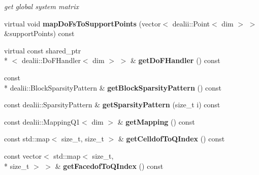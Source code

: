 \begin{DoxyCompactItemize}
\begin{DoxyCompactList}\small\item\em get global system matrix \end{DoxyCompactList}\item 
\hypertarget{classnatrium_1_1SEDGMinLee_ab01fe7f989aed26cb5547eaba8ddb4ee}{virtual void {\bfseries map\-Do\-Fs\-To\-Support\-Points} (vector$<$ dealii\-::\-Point$<$ dim $>$ $>$ \&support\-Points) const }\label{classnatrium_1_1SEDGMinLee_ab01fe7f989aed26cb5547eaba8ddb4ee}

\item 
\hypertarget{classnatrium_1_1SEDGMinLee_a3ffd3d7bc5aae9dbb5a021d7e4913f65}{virtual const shared\-\_\-ptr\\*
$<$ dealii\-::\-Do\-F\-Handler$<$ dim $>$ $>$ \& {\bfseries get\-Do\-F\-Handler} () const }\label{classnatrium_1_1SEDGMinLee_a3ffd3d7bc5aae9dbb5a021d7e4913f65}

\item 
\hypertarget{classnatrium_1_1SEDGMinLee_a10acabaac20a992130e88fb9bd395d31}{const \\*
dealii\-::\-Block\-Sparsity\-Pattern \& {\bfseries get\-Block\-Sparsity\-Pattern} () const }\label{classnatrium_1_1SEDGMinLee_a10acabaac20a992130e88fb9bd395d31}

\item 
\hypertarget{classnatrium_1_1SEDGMinLee_ac9392932aaab8186b427b9d12bc64771}{const dealii\-::\-Sparsity\-Pattern \& {\bfseries get\-Sparsity\-Pattern} (size\-\_\-t i) const }\label{classnatrium_1_1SEDGMinLee_ac9392932aaab8186b427b9d12bc64771}

\item 
\hypertarget{classnatrium_1_1SEDGMinLee_a7d093da19c6796a3021f5d3f4beab542}{const dealii\-::\-Mapping\-Q1$<$ dim $>$ \& {\bfseries get\-Mapping} () const }\label{classnatrium_1_1SEDGMinLee_a7d093da19c6796a3021f5d3f4beab542}

\item 
\hypertarget{classnatrium_1_1SEDGMinLee_a8947d4078fadf1f71fcd7304210fa75c}{const std\-::map$<$ size\-\_\-t, size\-\_\-t $>$ \& {\bfseries get\-Celldof\-To\-Q\-Index} () const }\label{classnatrium_1_1SEDGMinLee_a8947d4078fadf1f71fcd7304210fa75c}

\item 
\hypertarget{classnatrium_1_1SEDGMinLee_a8b7d94c90ccfa5e341d854059d883f57}{const vector$<$ std\-::map$<$ size\-\_\-t, \\*
size\-\_\-t $>$ $>$ \& {\bfseries get\-Facedof\-To\-Q\-Index} () const }\label{classnatrium_1_1SEDGMinLee_a8b7d94c90ccfa5e341d854059d883f57}


\end{DoxyCompactItemize}
